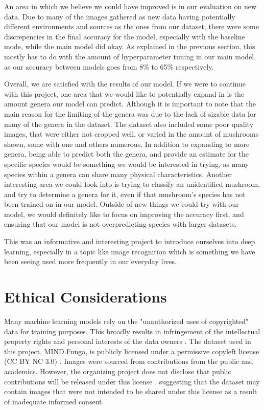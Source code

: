 \documentclass{article} %
\begin{document}
An area in which we believe we could have improved is in our evaluation on new data. Due to many of the images gathered as new data having potentially different environments and sources as the ones from our dataset, there were some discrepencies in the final accuracy for the model, especially with the baseline mode, while the main model did okay. As explained in the previous section, this mostly has to do with the amount of hyperparameter tuning in our main model, as our accuracy between models goes from 8\% to 65\% respectively. 

Overall, we are satisfied with the results of our model. If we were to continue with this project, one area that we would like to potentially expand in is the amount genera our model can predict. Although it is important to note that the main reason for the limiting of the genera was due to the lack of sizable data for many of the genera in the dataset. The dataset also included some poor quality images, that were either not cropped well, or varied in the amount of mushrooms shown, some with one and others numerous. In addition to expanding to more genera, being able to predict both the genera, and provide an estimate for the specific species would be something we would be interested in trying, as many species within a genera can share many physical characteristics. Another interesting area we could look into is trying to classify an unidentified mushroom, and try to determine a genera for it, even if that mushroom's species has not been trained on in our model. Outside of new things we could try with our model, we would definitely like to focus on improving the accuracy first, and ensuring that our model is not overpredicting species with larger datasets. 

This was an informative and interesting project to introduce ourselves into deep learning, especially in a topic like image recognition which is something we have been seeing used more frequently in our everyday lives.

\section{Ethical Considerations}
\label{sec:ethics}
Many machine learning models rely on the "unauthorized uses of copyrighted" data for training purposes. This broadly results in infringement of the intellectual property rights and personal interests of the data owners \citep{Sobel.TaxonomyTrainingData.2021}. The dataset used in this project, MIND.Funga, is publicly licensed under a permissive copyleft license (CC BY NC 3.0) \citep{Drechsler-SantosKarstedtEtAl.MINDFunga.2023}. Images were sourced from contributions from the public and academics. However, the organizing project does not disclose that public contributions will be released under this license \citep{Drechsler-SantosKarstedtEtAl.MINDFunga.2023}, suggesting that the dataset may contain images that were not intended to be shared under this license as a result of inadequate informed consent.
\end{document}
